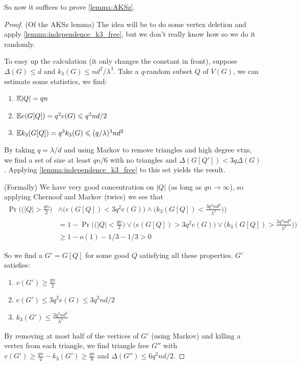 So now it suffices to prove \ref{lemma:AKSz}.
\begin{proof}
	(Of the AKSz lemma)
	The idea will be to do some vertex deletion and apply
	\ref{lemma:independence_k3_free}, but we don't really
	know how so we do it randomly.

	To easy up the calculation (it only changes the constant in front),
	suppose $\Delta(G) \leq d$ and $k_3(G) \leq nd^2/\lambda^3$.
	Take a $q$-random subset $Q$ of $V(G)$, we can estimate some
	statistics, we find:
	\begin{enumerate}[label=(\roman*)]
		\item $\mathbb{E} |Q| = qn$
		\item $\mathbb{E} e(G[Q]) = q^2e(G) \leqslant q^2nd/2$
		\item $\mathbb{E} k_3(G[Q]) = q^3k_3(G) \leqslant (q/\lambda)^3nd^2$
	\end{enumerate}

	By taking $q = \lambda/d$ and using Markov to remove triangles and
	high degree vtxs, we find a set of  size at least $qn/6$ with no triangles
	and $\Delta(G[Q']) < 3q\Delta(G)$. Applying
	\ref{lemma:independence_k3_free} to this set yields the result.

	(Formally)
	We have very good concentration on $|Q|$ (as long as $qn \to
	\infty$), so applying Chernoof and Markov (twice) we
	see that
	\begin{align*}
		\Pr\bigg( \bigg(|Q| > \frac{qn}{2}\bigg) &\land \bigg(e(G[Q]) <
			3q^2e(G)\bigg)
		\land \bigg(k_3(G[Q]) < \frac{3q^3nd^2}{\lambda^3}\bigg) \bigg)\\
		&= 1 -\Pr\bigg( \bigg(|Q| < \frac{qn}{2}\bigg) \lor \bigg(e(G[Q])
			> 3q^2e(G)\bigg)
		\lor \bigg(k_3(G[Q]) > \frac{3q^3nd^2}{\lambda^3}\bigg) \bigg)\\
		&\geq 1 - o(1) - 1/3 - 1/3 > 0
	\end{align*}

	So we find a $G' = G[Q]$ for some good $Q$ satisfying all these
	properties. $G'$ satisfies:
	\begin{enumerate}[label=(\roman*)]
		\item $v(G') \geq \frac{qn}{2}$
		\item $e(G') \leq 3q^2e(G) \leq 3q^2nd/2$
		\item $k_3(G') \leq \frac{3q^3nd^2}{\lambda^3}$
	\end{enumerate}

	By removing at most half of the vertices of $G'$ (using Markov) and
	killing a vertex from each triangle,
	we find triangle free $G''$ with $v(G') \geq \frac{qn}{4} - k_3(G')
	\geq \frac{qn}{8}$ and $\Delta(G'') \leq 6q^2nd/2$.
\end{proof}

